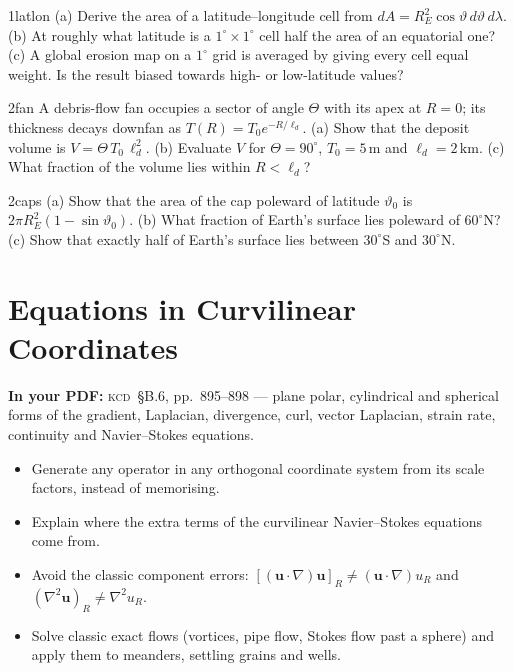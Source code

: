 \documentclass[11pt,letterpaper]{article}
\numberwithin{equation}{section}
\newcommand{\uu}{\mathbf{u}}
\newcommand{\units}[1]{\,\mathrm{#1}}
\newcommand{\Kundu}{\textnormal{\textsc{kcd}}}   %
\begin{document}
\begin{exercise}{1}{latlon}
(a) Derive the area of a latitude--longitude cell from $dA=R_E^2\cos\vartheta\,d\vartheta\,d\lambda$.
(b) At roughly what latitude is a $1^\circ\times1^\circ$ cell half the area of an equatorial one?
(c) A global erosion map on a $1^\circ$ grid is averaged by giving every cell equal weight. Is the result biased towards
high- or low-latitude values?
\end{exercise}

\begin{exercise}{2}{fan}
A debris-flow fan occupies a sector of angle $\Theta$ with its apex at $R=0$; its thickness decays downfan as
$T(R)=T_0e^{-R/\ell_d}$.
(a) Show that the deposit volume is $V=\Theta\,T_0\,\ell_d^2$.
(b) Evaluate $V$ for $\Theta=90^\circ$, $T_0=5\units{m}$ and $\ell_d=2\units{km}$.
(c) What fraction of the volume lies within $R<\ell_d$?
\end{exercise}

\begin{exercise}{2}{caps}
(a) Show that the area of the cap poleward of latitude $\vartheta_0$ is $2\pi R_E^2(1-\sin\vartheta_0)$.
(b) What fraction of Earth's surface lies poleward of $60^\circ$N?
(c) Show that exactly half of Earth's surface lies between $30^\circ$S and $30^\circ$N.
\end{exercise}

\clearpage
\section{Equations in Curvilinear Coordinates}\label{sec:B6}
\begin{source}
\textbf{In your PDF:} \Kundu\ \S B.6, pp.~895--898 --- plane polar, cylindrical and spherical forms of the gradient, Laplacian,
divergence, curl, vector Laplacian, strain rate, continuity and Navier--Stokes equations.
\end{source}

\begin{goals}
\begin{itemize}
  \item Generate any operator in any orthogonal coordinate system from its scale factors, instead of memorising.
  \item Explain where the extra terms of the curvilinear Navier--Stokes equations come from.
  \item Avoid the classic component errors: $[(\uu\cdot\nabla)\uu]_R\neq(\uu\cdot\nabla)u_R$ and $(\nabla^2\uu)_R\neq\nabla^2u_R$.
  \item Solve classic exact flows (vortices, pipe flow, Stokes flow past a sphere) and apply them to meanders, settling grains
        and wells.
\end{itemize}
\end{goals}
\end{document}
